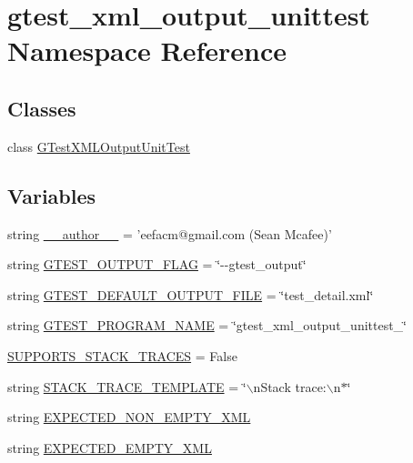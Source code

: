 \hypertarget{namespacegtest__xml__output__unittest}{\section{gtest\-\_\-xml\-\_\-output\-\_\-unittest \-Namespace \-Reference}
\label{da/d52/namespacegtest__xml__output__unittest}
}
\subsection*{\-Classes}
\begin{DoxyCompactItemize}
\item 
class \hyperlink{classgtest__xml__output__unittest_1_1GTestXMLOutputUnitTest}{\-G\-Test\-X\-M\-L\-Output\-Unit\-Test}
\end{DoxyCompactItemize}
\subsection*{\-Variables}
\begin{DoxyCompactItemize}
\item 
string \hyperlink{namespacegtest__xml__output__unittest_a629d61dfe4da763164a4d1a2d85b0afd}{\-\_\-\-\_\-author\-\_\-\-\_\-} = 'eefacm@gmail.\-com (\-Sean \-Mcafee)'
\item 
string \hyperlink{namespacegtest__xml__output__unittest_abb51de98c0795d52837d2b1f941cce03}{\-G\-T\-E\-S\-T\-\_\-\-O\-U\-T\-P\-U\-T\-\_\-\-F\-L\-A\-G} = \char`\"{}-\/-\/gtest\-\_\-output\char`\"{}
\item 
string \hyperlink{namespacegtest__xml__output__unittest_a365e0838bf48fd7b4fba71d9719f696e}{\-G\-T\-E\-S\-T\-\_\-\-D\-E\-F\-A\-U\-L\-T\-\_\-\-O\-U\-T\-P\-U\-T\-\_\-\-F\-I\-L\-E} = \char`\"{}test\-\_\-detail.\-xml\char`\"{}
\item 
string \hyperlink{namespacegtest__xml__output__unittest_a3a0d7920c0a9c463f259b8caee906897}{\-G\-T\-E\-S\-T\-\_\-\-P\-R\-O\-G\-R\-A\-M\-\_\-\-N\-A\-M\-E} = \char`\"{}gtest\-\_\-xml\-\_\-output\-\_\-unittest\-\_\-\char`\"{}
\item 
\hyperlink{namespacegtest__xml__output__unittest_ab8494653f66ef3793c6d966c3d982ffb}{\-S\-U\-P\-P\-O\-R\-T\-S\-\_\-\-S\-T\-A\-C\-K\-\_\-\-T\-R\-A\-C\-E\-S} = \-False
\item 
string \hyperlink{namespacegtest__xml__output__unittest_a9b742f68cba24d2b6b925d5a28a3d6c6}{\-S\-T\-A\-C\-K\-\_\-\-T\-R\-A\-C\-E\-\_\-\-T\-E\-M\-P\-L\-A\-T\-E} = \char`\"{}$\backslash$n\-Stack trace\-:$\backslash$n$\ast$\char`\"{}
\item 
string \hyperlink{namespacegtest__xml__output__unittest_a7dc55472313add0fa8137de6ad1b5bde}{\-E\-X\-P\-E\-C\-T\-E\-D\-\_\-\-N\-O\-N\-\_\-\-E\-M\-P\-T\-Y\-\_\-\-X\-M\-L}
\item 
string \hyperlink{namespacegtest__xml__output__unittest_a5f362322c6ef5a690a3303f5df43fb40}{\-E\-X\-P\-E\-C\-T\-E\-D\-\_\-\-E\-M\-P\-T\-Y\-\_\-\-X\-M\-L}
\end{DoxyCompactItemize}



